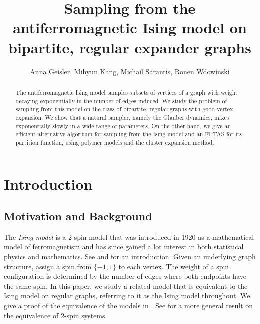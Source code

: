 \documentclass[reqno,a4paper,11pt]{amsart}
\title{Sampling from the antiferromagnetic Ising model on bipartite, regular expander graphs}
\author{Anna Geisler, Mihyun Kang, Michail Sarantis, Ronen Wdowinski}
\begin{document}
\maketitle
\begin{abstract}
    The antiferromagnetic Ising model samples subsets of vertices of a graph with weight decaying exponentially in the number of edges induced. We study the problem of sampling from this model on the class of bipartite, regular graphs with good vertex expansion. We show that a natural sampler, namely the Glauber dynamics, mixes exponentially slowly in a wide range of parameters. On the other hand, we give an efficient alternative algorithm for sampling from the Ising model and an FPTAS for its partition function, using polymer models and the cluster expansion method.
\end{abstract}

\section{Introduction}

\subsection{Motivation and Background}

The \emph{Ising model} is a 2-spin model that was introduced in 1920 as a mathematical model of ferromagnetism and has since gained a lot interest in both statistical physics and mathematics. See \cite{Cipra87} and \cite[Chapter 3]{FriVe18} for an introduction.
Given an underlying graph structure, assign a spin from $\{-1,1\}$ to each vertex. The weight of a spin configuration is determined by the number of edges where both endpoints have the same spin. In this paper, we study a related model that is equivalent to the Ising model on regular graphs, referring to it as the Ising model throughout. We give a proof of the equivalence of the models in . See \cite[Section 2.1]{SuSly12} for a more general result on the equivalence of $2$-spin systems.
\end{document}
